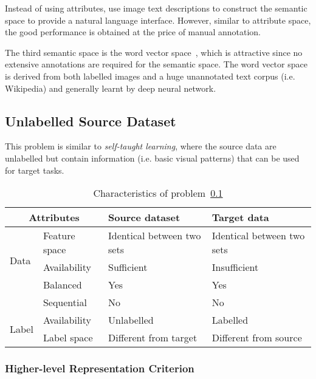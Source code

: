 \documentclass[prodmode]{acmsmall}  %
\begin{document}
Instead of using attributes,  use image text descriptions to construct the semantic space to provide a natural language interface. However, similar to attribute space, the good performance is obtained at the price of manual annotation.

The third semantic space is the word vector space~\cite{Frome2013,Mikolov2013,Socher2013,LeiBa2015}, which is attractive since no extensive annotations are required for the semantic space. The word vector space is derived from both labelled images and a huge unannotated text corpus (i.e. Wikipedia) and generally learnt by deep neural network.

\subsection{Unlabelled Source Dataset}
\label{sec:HETELself}

This problem is similar to \textit{self-taught learning}, where the source data are unlabelled but contain information (i.e. basic visual patterns) that can be used for target tasks. 
\begin{table}[htbp!]
\caption{Characteristics of problem~\ref{sec:HETELself}}
\label{tab:HETELself}
\begin{center}
\begin{small}
\begin{tabular}{|p{1cm}<{\centering}|m{2.5cm}<{\centering}|m{4.3cm}<{\centering}|m{4.3cm}<{\centering}|}
\hline
\multicolumn{2}{|c|}{Attributes} & Source dataset & Target data \\
\hline \hline
\multirow{3}{*}{Data} & Feature space & Identical between two sets & Identical between two sets \\ 
\cline{2-4}{} & Availability & Sufficient & {Insufficient} \\
\cline{2-4}{} & Balanced & Yes & Yes \\
\cline{2-4}{} & Sequential & No & No \\
\hline \hline
\multirow{2}{*}{Label} & Availability & {\color{red}Unlabelled} & Labelled \\
\cline{2-4}{}  & Label space & Different from target & {\color{red}Different from source}  \\ 
\hline
\end{tabular}
\end{small}
\end{center}
\end{table}
\subsubsection{Higher-level Representation Criterion}
\end{document}
